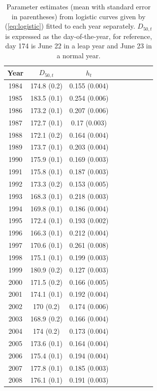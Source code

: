 \documentclass[12pt,]{book}
\theoremstyle{definition}
\theoremstyle{definition}
\theoremstyle{definition}
\theoremstyle{remark}
\begin{document}
\clearpage

\begin{singlespace}

\begin{table}

\caption{\label{tab:rt-ests-table}Parameter estimates (mean with standard error in parentheses) from
      logistic curves given by (\ref{eq:logistic}) fitted to each year separately. $D_{50,t}$ is expressed
      as the day-of-the-year, for reference, day 174 is June 22 in a leap year and June 23 in a normal year.}
\centering
\begin{tabular}[t]{ccccccccc}
\toprule
Year & $D_{50,t}$ & $h_t$\\
\midrule
1984 & 174.8 (0.2) & 0.155 (0.004)\\
1985 & 183.5 (0.1) & 0.254 (0.006)\\
1986 & 173.2 (0.1) & 0.207 (0.006)\\
1987 & 172.7 (0.1) & 0.17 (0.003)\\
1988 & 172.1 (0.2) & 0.164 (0.004)\\
1989 & 173.7 (0.1) & 0.203 (0.004)\\
1990 & 175.9 (0.1) & 0.169 (0.003)\\
1991 & 175.8 (0.1) & 0.187 (0.003)\\
1992 & 173.3 (0.2) & 0.153 (0.005)\\
1993 & 168.3 (0.1) & 0.218 (0.003)\\
1994 & 169.8 (0.1) & 0.186 (0.004)\\
1995 & 172.4 (0.1) & 0.193 (0.002)\\
1996 & 166.3 (0.1) & 0.212 (0.004)\\
1997 & 170.6 (0.1) & 0.261 (0.008)\\
1998 & 175.1 (0.1) & 0.199 (0.003)\\
1999 & 180.9 (0.2) & 0.127 (0.003)\\
2000 & 171.5 (0.2) & 0.166 (0.005)\\
2001 & 174.1 (0.1) & 0.192 (0.004)\\
2002 & 170 (0.2) & 0.174 (0.006)\\
2003 & 168.9 (0.2) & 0.166 (0.004)\\
2004 & 174 (0.2) & 0.173 (0.004)\\
2005 & 173.6 (0.1) & 0.164 (0.004)\\
2006 & 175.4 (0.1) & 0.194 (0.004)\\
2007 & 177.8 (0.1) & 0.185 (0.003)\\
2008 & 176.1 (0.1) & 0.191 (0.003)\\

\end{tabular}
\end{table}
\end{singlespace}
\end{document}
